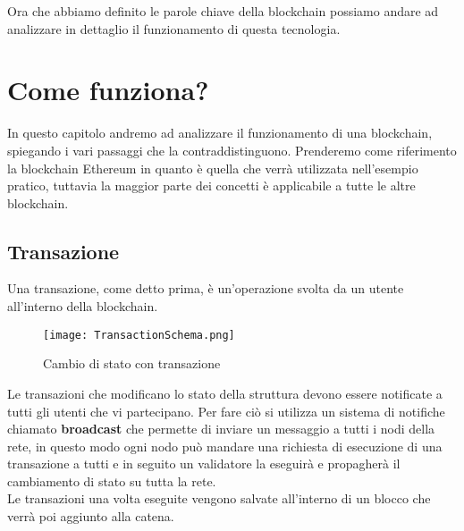 Ora che abbiamo definito le parole chiave della blockchain possiamo andare ad
analizzare in dettaglio il funzionamento di questa tecnologia.

\newpage

\section{Come funziona?}
In questo capitolo andremo ad analizzare il funzionamento di una blockchain,
spiegando i vari passaggi che la contraddistinguono. Prenderemo come
riferimento la blockchain Ethereum in quanto è quella che verrà utilizzata
nell'esempio pratico, tuttavia la maggior parte dei concetti è applicabile 
a tutte le altre blockchain.

\subsection{Transazione}
Una transazione, come detto prima, è un'operazione svolta da un utente
all'interno della blockchain. 

\begin{figure}[H]
    \centering
    \texttt{[image: TransactionSchema.png]} 
    \caption{Cambio di stato con transazione}
    \label{fig:transactionSchema}
\end{figure}

Le transazioni che modificano lo stato della struttura devono essere notificate
a tutti gli utenti che vi partecipano. Per fare ciò si utilizza un sistema di
notifiche chiamato \textbf{broadcast} che permette di inviare un messaggio a
tutti i nodi della rete, in questo modo ogni nodo può mandare una richiesta di
esecuzione di una transazione a tutti e in seguito un validatore la eseguirà e
propagherà il cambiamento di stato su tutta la rete. \\
Le transazioni una volta eseguite vengono salvate all'interno di un blocco che
verrà poi aggiunto alla catena.

